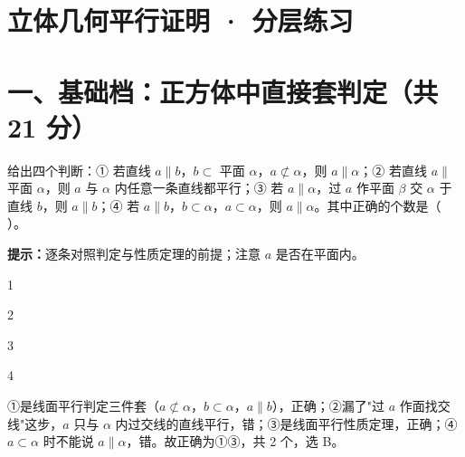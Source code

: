 \documentclass{exam-zh}
\begin{document}
\section*{立体几何平行证明 · 分层练习}

\section*{一、基础档：正方体中直接套判定（共 21 分）}


\begin{question}[points=5]
  给出四个判断：① 若直线 $a\parallel b$，$b\subset$ 平面 $\alpha$，$a\not\subset\alpha$，则 $a\parallel\alpha$；② 若直线 $a\parallel$ 平面 $\alpha$，则 $a$ 与 $\alpha$ 内任意一条直线都平行；③ 若 $a\parallel\alpha$，过 $a$ 作平面 $\beta$ 交 $\alpha$ 于直线 $b$，则 $a\parallel b$；④ 若 $a\parallel b$，$b\subset\alpha$，$a\subset\alpha$，则 $a\parallel\alpha$。其中正确的个数是（    ）。
  \begin{hintbox}
\textbf{提示：}逐条对照判定与性质定理的前提；注意 $a$ 是否在平面内。\end{hintbox}

  \begin{choices}
    \item 1
    \item 2
    \item 3
    \item 4
  \end{choices}
  \paren[B]
  \begin{solutionblock}
    ①是线面平行判定三件套（$a\not\subset\alpha$，$b\subset\alpha$，$a\parallel b$），正确；②漏了"过 $a$ 作面找交线"这步，$a$ 只与 $\alpha$ 内过交线的直线平行，错；③是线面平行性质定理，正确；④$a\subset\alpha$ 时不能说 $a\parallel\alpha$，错。故正确为①③，共 2 个，选 B。
  \end{solutionblock}
\end{question}
\end{document}
